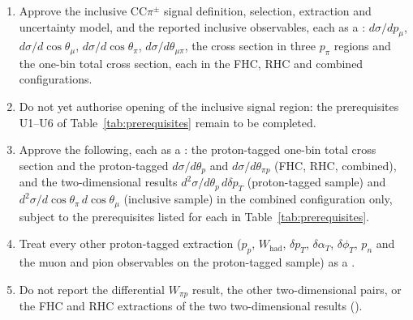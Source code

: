 \begin{enumerate}\itemsep1pt
  \item Approve the inclusive CC$\pi^\pm$ signal definition, selection, extraction and uncertainty model,
    and the reported inclusive observables, each as a \statPrimary{}: $d\sigma/dp_\mu$,
    $d\sigma/d\cos\theta_\mu$, $d\sigma/d\cos\theta_\pi$, $d\sigma/d\theta_{\mu\pi}$, the cross section in
    three $p_\pi$ regions and the one-bin total cross section, each in the FHC, RHC and combined
    configurations.
  \item Do not yet authorise opening of the inclusive signal region: the prerequisites U1--U6 of
    Table~\ref{tab:prerequisites} remain to be completed.
  \item Approve the following, each as a \statSecondary{}: the proton-tagged one-bin total cross
    section and the
    proton-tagged $d\sigma/d\theta_p$ and $d\sigma/d\theta_{\pi p}$ (FHC, RHC, combined), and the
    two-dimensional results $d^2\sigma/d\theta_p\,d\delta p_T$ (proton-tagged sample) and
    $d^2\sigma/d\cos\theta_\pi\,d\cos\theta_\mu$ (inclusive sample) in the combined configuration only,
    subject to the prerequisites listed for each in Table~\ref{tab:prerequisites}.
  \item Treat every other proton-tagged extraction ($p_p$, $W_\mathrm{had}$, $\delta p_T$,
    $\delta\alpha_T$, $\delta\phi_T$, $p_n$ and the muon and pion observables on the proton-tagged
    sample) as a \statValidation{}.
  \item Do not report the differential $W_{\pi p}$ result, the other two-dimensional pairs, or the FHC and
    RHC extractions of the two two-dimensional results (\statNotReported{}).
\end{enumerate}
